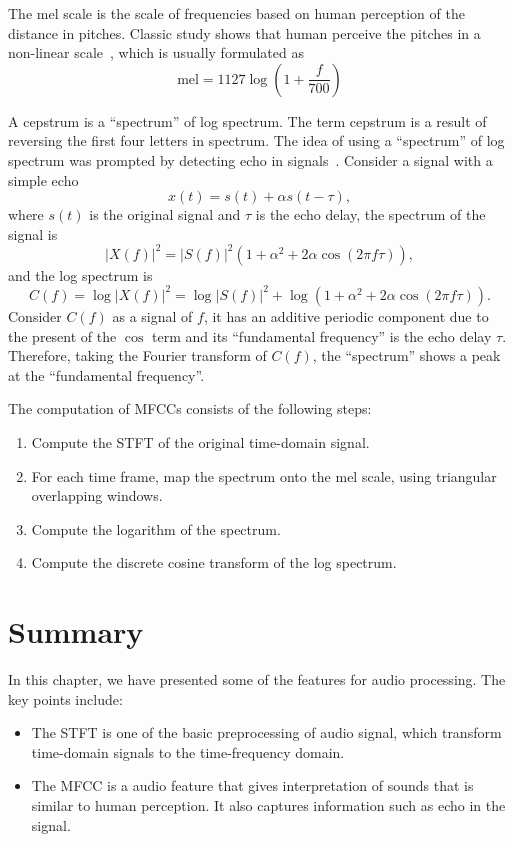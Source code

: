 \documentclass[12pt,final,twoside]{report}
\begin{document}
The mel scale is the scale of frequencies based on human perception of the distance in pitches. Classic study shows that human perceive the pitches in a non-linear scale~\cite{stevens_scale_1937}, which is usually formulated as~\cite{oshaughnessy_speech_1987}
\begin{equation}
  \text{mel} = 1127 \log (1 + \frac{f}{700})
\end{equation}

A cepstrum is a ``spectrum'' of log spectrum. The term cepstrum is a result of reversing the first four letters in spectrum. The idea of using a ``spectrum'' of log spectrum was prompted by detecting echo in signals~\cite{oppenheim_frequency_2004}. Consider a signal with a simple echo
\begin{equation}
  x(t) = s(t) + \alpha s(t - \tau),
\end{equation}
where $s(t)$ is the original signal and $\tau$ is the echo delay, the spectrum of the signal is
\begin{equation}
  \left| X(f) \right|^2 = \left| S(f) \right|^2 (1 + \alpha^2 + 2 \alpha \cos(2 \pi f \tau)),
\end{equation}
and the log spectrum is
\begin{equation}
  C(f) = \log \left| X(f) \right|^2 = \log \left| S(f) \right|^2 + \log (1 + \alpha^2 + 2 \alpha \cos(2 \pi f \tau)).
\end{equation}
Consider $C(f)$ as a signal of $f$, it has an additive periodic component due to the present of the $\cos$ term and its ``fundamental frequency'' is the echo delay $\tau$. Therefore, taking the Fourier transform of $C(f)$, the ``spectrum'' shows a peak at the ``fundamental frequency''. 

The computation of MFCCs consists of the following steps:
\begin{enumerate}
  \item Compute the STFT of the original time-domain signal.
  \item For each time frame, map the spectrum onto the mel scale, using triangular overlapping windows.
  \item Compute the logarithm of the spectrum.
  \item Compute the discrete cosine transform of the log spectrum.
\end{enumerate}

\section{Summary}
In this chapter, we have presented some of the features for audio processing. The key points include:
\begin{itemize}
  \item The STFT is one of the basic preprocessing of audio signal, which transform time-domain signals to the time-frequency domain.
  \item The MFCC is a audio feature that gives interpretation of sounds that is similar to human perception. It also captures information such as echo in the signal.
\end{itemize}
\end{document}

